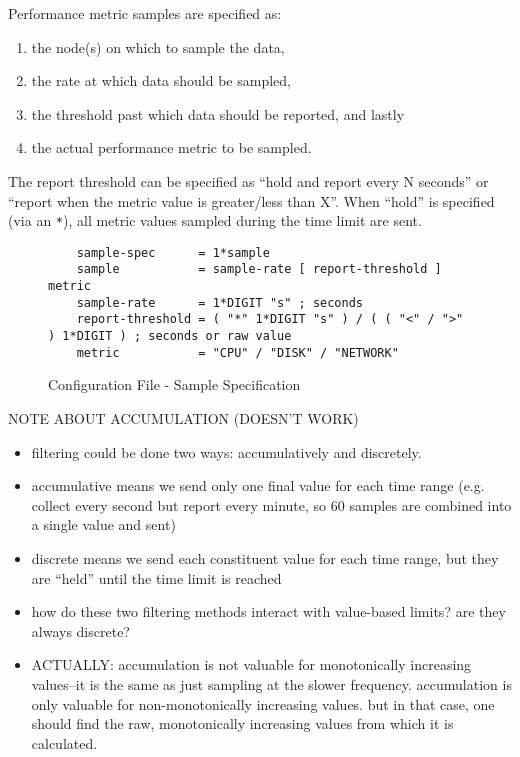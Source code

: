 Performance metric samples are specified as:

\begin{enumerate}
\item the node(s) on which to sample the data,
\item the rate at which data should be sampled,
\item the threshold past which data should be reported, and lastly
\item the actual performance metric to be sampled.
\end{enumerate}

The report threshold can be specified as ``hold and report every N seconds'' or ``report when the metric value is
greater/less than X''. When ``hold'' is specified (via an \texttt{*}), all metric values sampled during the time limit
are sent.

\begin{figure}[ht]
    \begin{lstlisting}
    sample-spec      = 1*sample
    sample           = sample-rate [ report-threshold ] metric
    sample-rate      = 1*DIGIT "s" ; seconds
    report-threshold = ( "*" 1*DIGIT "s" ) / ( ( "<" / ">" ) 1*DIGIT ) ; seconds or raw value
    metric           = "CPU" / "DISK" / "NETWORK"
    \end{lstlisting}
    \caption{Configuration File - Sample Specification}
    \label{fig:config_file_sample}
\end{figure}

NOTE ABOUT ACCUMULATION (DOESN'T WORK)

\begin{itemize}
\item filtering could be done two ways: accumulatively and discretely.
\item accumulative means we send only one final value for each time range (e.g. collect every second but report every
      minute, so 60 samples are combined into a single value and sent)
\item discrete means we send each constituent value for each time range, but they are ``held'' until the time limit is
      reached
\item how do these two filtering methods interact with value-based limits? are they always discrete?
\item ACTUALLY: accumulation is not valuable for monotonically increasing values--it is the same as just sampling at the
      slower frequency. accumulation is only valuable for non-monotonically increasing values. but in that case, one
      should find the raw, monotonically increasing values from which it is calculated.
\end{itemize}

